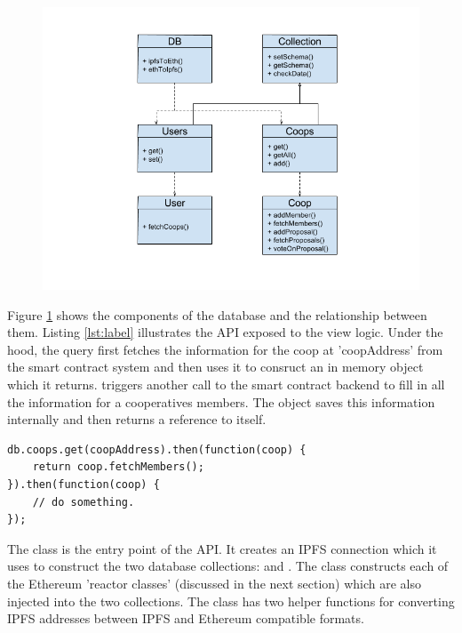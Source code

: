 \begin{figure}
\centering
\includegraphics[width=\textwidth]{Figures/dbClassDiagram}
\decoRule
\caption[]{ }
\label{fig:dbClassDiagram}
\end{figure}

Figure \ref{fig:dbClassDiagram} shows the components of the database and the relationship between them. Listing \ref{lst:label} illustrates the API exposed to the view logic. Under the hood, the query first fetches the information for the coop at 'coopAddress' from the smart contract system and then uses it to consruct an in memory  object which it returns.  triggers another call to the smart contract backend to fill in all the information for a cooperatives members. The  object saves this information internally and then returns a reference to itself. \\

\begin{lstlisting}[caption={Example query to the front end database api}, label={lst:label}]
db.coops.get(coopAddress).then(function(coop) {
	return coop.fetchMembers();
}).then(function(coop) {
	// do something.
});
\end{lstlisting}

The  class is the entry point of the API. It creates an IPFS connection which it uses to construct the two database collections:  and . The  class constructs each of the Ethereum 'reactor classes' (discussed in the next section) which are also injected into the two collections. The  class has two helper functions for converting IPFS addresses between IPFS and Ethereum compatible formats.\\

